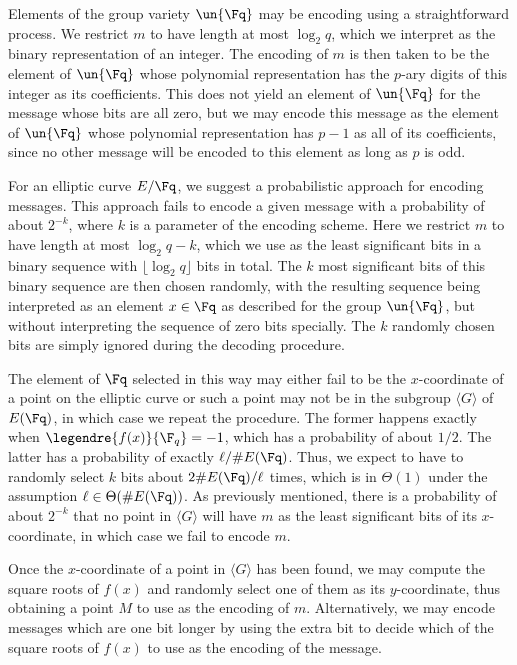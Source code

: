 Elements of the group variety $\un{\Fq}$ may be encoding using a straightforward process. We restrict $m$ to have length at most $\log_2 q$, which we interpret as the binary representation of an integer. The encoding of $m$ is then taken to be the element of $\un{\Fq}$ whose polynomial representation has the $p$-ary digits of this integer as its coefficients. This does not yield an element of $\un{\Fq}$ for the message whose bits are all zero, but we may encode this message as the element of $\un{\Fq}$ whose polynomial representation has $p - 1$ as all of its coefficients, since no other message will be encoded to this element as long as $p$ is odd.

For an elliptic curve $E / \Fq$, we suggest a probabilistic approach for encoding messages. This approach fails to encode a given message with a probability of about $2^{-k}$, where $k$ is a parameter of the encoding scheme. Here we restrict $m$ to have length at most $\log_2 q - k$, which we use as the least significant bits in a binary sequence with $\lfloor \log_2 q \rfloor$ bits in total. The $k$ most significant bits of this binary sequence are then chosen randomly, with the resulting sequence being interpreted as an element $x \in \Fq$ as described for the group $\un{\Fq}$, but without interpreting the sequence of zero bits specially. The $k$ randomly chosen bits are simply ignored during the decoding procedure.

The element of $\Fq$ selected in this way may either fail to be the $x$-coordinate of a point on the elliptic curve or such a point may not be in the subgroup $\langle G \rangle$ of $E(\Fq)$, in which case we repeat the procedure. The former happens exactly when $\legendre{f(x)}{\F_q} = -1$, which has a probability of about $1 / 2$. The latter has a probability of exactly $\ell / \#E(\Fq)$. Thus, we expect to have to randomly select $k$ bits about $2\#E(\Fq) / \ell$ times, which is in $\Theta(1)$ under the assumption $\ell \in \Theta(\#E(\Fq))$. As previously mentioned, there is a probability of about $2^{-k}$ that no point in $\langle G \rangle$ will have $m$ as the least significant bits of its $x$-coordinate, in which case we fail to encode $m$.

Once the $x$-coordinate of a point in $\langle G \rangle$ has been found, we may compute the square roots of $f(x)$ and randomly select one of them as its $y$-coordinate, thus obtaining a point $M$ to use as the encoding of $m$. Alternatively, we may encode messages which are one bit longer by using the extra bit to decide which of the square roots of $f(x)$ to use as the encoding of the message.

